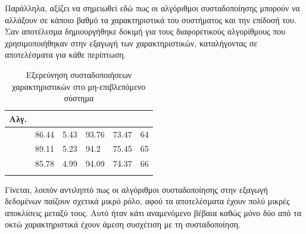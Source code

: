 Παράλληλα, αξίζει να σημειωθεί εδώ πως οι αλγόριθμοι συσταδοποίησης μπορούν να αλλάξουν σε κάποιο βαθμό τα χαρακτηριστικά του συστήματος και την επίδοσή του. Σαν αποτέλεσμα δημιουργήθηκε δοκιμή για τους διαφορετικούς αλγορίθμους που χρησιμοποιήθηκαν στην εξαγωγή των χαρακτηριστικών, καταλήγοντας σε αποτελέσματα για κάθε περίπτωση.
\begin{center}
\begin{longtabu} to 0.8\textwidth { | X[c] || X[c] | X[c] | X[c] | X[c] | X[c] |  }
 \hline
 Αλγ.&   &  &  &  & \\
\hline
  & 86.44	&	5.43 &	93.76 &	73.47 &	64\\
\hline
 & 89.11	&	5.23 &	94.2 &	75.45 &	65\\ 
 \hline
   & 85.78	&	4.99 &	94.09 &	74.37 &	66\\
\hline
\caption{Εξερεύνηση συσταδοποιήσεων χαρακτηριστικών στο μη-επιβλεπόμενο σύστημα}
\label{tab:testclusterunsup}
\end{longtabu}
\end{center}
Γίνεται, λοιπόν αντιληπτό πως οι αλγόριθμοι συσταδοποίησης στην εξαγωγή δεδομένων παίζουν σχετικά μικρό ρόλο, αφού τα αποτελέσματα έχουν πολύ μικρές αποκλίσεις μεταξύ τους. Αυτό ήταν κάτι αναμενόμενο βέβαια καθώς μόνο δύο από τα οκτώ χαρακτηριστικά έχουν άμεση συσχέτιση με τη συσταδοποίηση.\par
